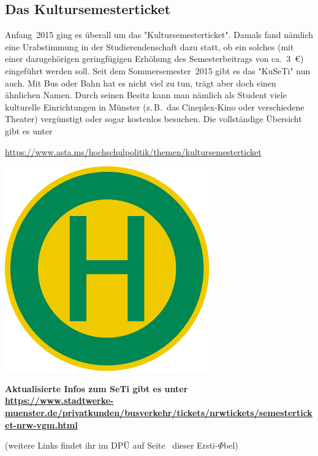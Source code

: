 \begin{multicols*}{2}
\subsection{Das Kultursemesterticket}
Anfang~2015 ging es überall um das "Kultursemesterticket".
Damals fand nämlich eine Urabstimmung in der Studierendenschaft dazu statt, ob ein solches (mit einer dazugehörigen geringfügigen Erhöhung des Semesterbeitrags von ca.\ \SI{3}{\euro}) eingeführt werden soll.
Seit dem Sommersemester~2015 gibt es das "KuSeTi" nun auch.
Mit Bus oder Bahn hat es nicht viel zu tun, trägt aber doch einen ähnlichen Namen.
Durch seinen Besitz kann man nämlich als Student viele kulturelle Einrichtungen in Münster (z.\,B.\ das Cineplex-Kino oder verschiedene Theater) vergünstigt oder sogar kostenlos besuchen.
Die vollständige Übersicht gibt es unter
\begin{center}
	\url{https://www.asta.ms/hochschulpolitik/themen/kultursemesterticket}
\end{center}

\smallskip

\begin{center}
	\includegraphics[width=\columnwidth, height=0.16\textheight]{res/bushaltestelle.pdf}

	{\bfseries
	Aktualisierte Infos zum SeTi gibt es unter\\
	\url{https://www.stadtwerke-muenster.de/privatkunden/busverkehr/tickets/nrwtickets/semesterticket-nrw-vgm.html}}
	
	(weitere Links findet ihr im DPÜ auf Seite~\pageref{dpü} dieser Ersti-$\Phi$bel)
\end{center}

\end{multicols*}
